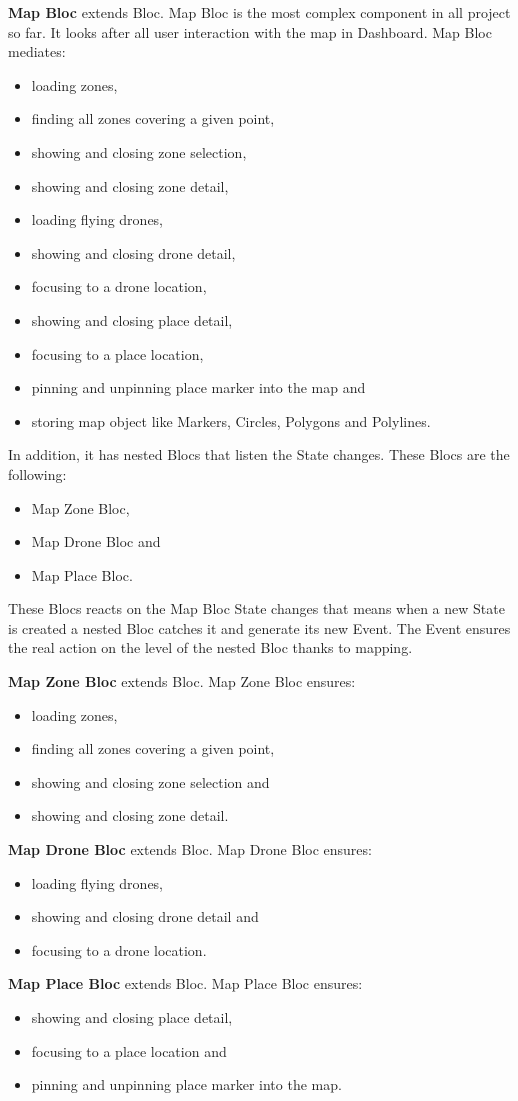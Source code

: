 \textbf{Map Bloc} extends Bloc.
Map Bloc is the most complex component in all project so far.
It looks after all user interaction with the map in Dashboard.
Map Bloc mediates:
\begin{itemize}
    \item loading zones,
    \item finding all zones covering a given point,
    \item showing and closing zone selection,
    \item showing and closing zone detail,
    \item loading flying drones,
    \item showing and closing drone detail,
    \item focusing to a drone location,
    \item showing and closing place detail,
    \item focusing to a place location,
    \item pinning and unpinning place marker into the map and
    \item storing map object like Markers, Circles, Polygons and Polylines.
\end{itemize}
In addition, it has nested Blocs that listen the State changes.
These Blocs are the following:
\begin{itemize}
    \item Map Zone Bloc,
    \item Map Drone Bloc and
    \item Map Place Bloc.
\end{itemize}
These Blocs reacts on the Map Bloc State changes that means when a new State is created a nested Bloc catches it and generate its new Event.
The Event ensures the real action on the level of the nested Bloc thanks to mapping.

\textbf{Map Zone Bloc} extends Bloc.
Map Zone Bloc ensures:
\begin{itemize}
    \item loading zones,
    \item finding all zones covering a given point,
    \item showing and closing zone selection and
    \item showing and closing zone detail.
\end{itemize}

\textbf{Map Drone Bloc} extends Bloc.
Map Drone Bloc ensures:
\begin{itemize}
    \item loading flying drones,
    \item showing and closing drone detail and
    \item focusing to a drone location.
\end{itemize}

\textbf{Map Place Bloc} extends Bloc.
Map Place Bloc ensures:
\begin{itemize}
    \item showing and closing place detail,
    \item focusing to a place location and
    \item pinning and unpinning place marker into the map.
\end{itemize}

